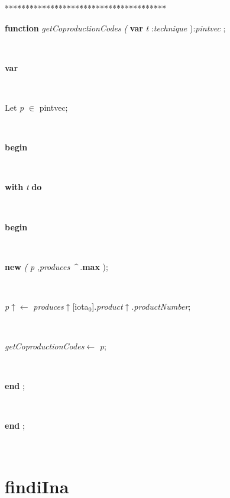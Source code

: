 \begin{tabbing}
***\=***\=***\=***\=***\=***\=***\=***\=***\=***\=***\=***\=***\=\kill
\parbox{14cm}{\textsf{\textbf{function}  \textit{getCoproductionCodes} \textit{(} \textbf{var}  \textit{t}  :\textit{technique} ):\textit{pintvec} ;}}\\
\+\parbox{14cm}{\textsf{\textbf{var} }}\\
\parbox{14cm}{\textsf{Let \textit{p} $\in$ pintvec;}}\\
\-\<\+\parbox{14cm}{\textsf{\textbf{begin} }}\\
\+\parbox{14cm}{\textsf {\textbf {with } \textsf{\textit{t}} \textbf{ do } }}\\
\<\parbox{14cm}{\textsf{\textbf{begin} }}\\
\parbox{14cm}{\textsf{\textbf{new} \textit{(} \textit{p} ,\textit{produces} \textit{\^{}} .\textbf{max} );}}\\
\parbox{14cm}{\textsf{\textit{p}$\uparrow$\textit{}$\leftarrow$ \textit{produces}$\uparrow$\textit{}[iota$_{0}$].\textit{product}$\uparrow$.\textit{productNumber}}; }\\
\parbox{14cm}{\textsf{\textit{getCoproductionCodes}$\leftarrow$ \textit{p}}; }\\
\<\-\parbox{14cm}{\textsf{\textbf{end} ;}}\\
\<\-\parbox{14cm}{\textsf{\textbf{end} ;}}\\
\end{tabbing}
\section{findiIna}\label{sec:technologiesfindiIna}

